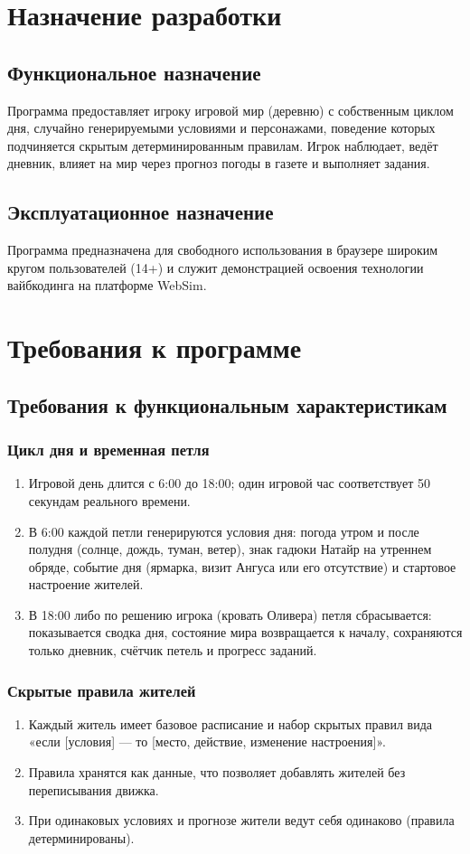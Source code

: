 \documentclass[12pt]{article}
\begin{document}
\section{Назначение разработки}
\subsection{Функциональное назначение}
Программа предоставляет игроку игровой мир (деревню) с собственным циклом дня, случайно генерируемыми условиями и персонажами, поведение которых подчиняется скрытым детерминированным правилам. Игрок наблюдает, ведёт дневник, влияет на мир через прогноз погоды в газете и выполняет задания.
\subsection{Эксплуатационное назначение}
Программа предназначена для свободного использования в браузере широким кругом пользователей (14+) и служит демонстрацией освоения технологии вайбкодинга на платформе WebSim.

\section{Требования к программе}
\subsection{Требования к функциональным характеристикам}
\subsubsection{Цикл дня и временная петля}
\begin{enumerate}
\item Игровой день длится с 6:00 до 18:00; один игровой час соответствует 50 секундам реального времени.
\item В 6:00 каждой петли генерируются условия дня: погода утром и после полудня (солнце, дождь, туман, ветер), знак гадюки Натайр на утреннем обряде, событие дня (ярмарка, визит Ангуса или его отсутствие) и стартовое настроение жителей.
\item В 18:00 либо по решению игрока (кровать Оливера) петля сбрасывается: показывается сводка дня, состояние мира возвращается к началу, сохраняются только дневник, счётчик петель и прогресс заданий.
\end{enumerate}
\subsubsection{Скрытые правила жителей}
\begin{enumerate}
\item Каждый житель имеет базовое расписание и набор скрытых правил вида «если [условия] — то [место, действие, изменение настроения]».
\item Правила хранятся как данные, что позволяет добавлять жителей без переписывания движка.
\item При одинаковых условиях и прогнозе жители ведут себя одинаково (правила детерминированы).
\end{enumerate}
\end{document}
